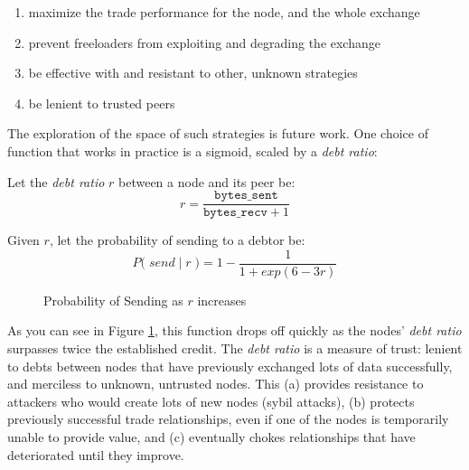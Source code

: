 \documentclass{sig-alternate}
\begin{document}
\begin{enumerate}
  \item maximize the trade performance for the node, and the whole exchange
  \item prevent freeloaders from exploiting and degrading the exchange
  \item be effective with and resistant to other, unknown
  strategies
  \item be lenient to trusted peers
\end{enumerate}

The exploration of the space of such strategies is future work.
One choice of function that works in practice is a sigmoid, scaled by a
\textit{debt ratio}:

Let the \textit{debt ratio} $ r $ between a node and its peer be:
  \[ r = \dfrac{\texttt{bytes\_sent}}{\texttt{bytes\_recv} + 1} \]

Given $r$, let the probability of sending to a debtor be:
  \[ P\Big( \; send \; | \; r \;\Big) = 1 - \dfrac{1}{1 + exp(6-3r)} \]

\begin{figure}
\centering
{}
\caption{Probability of Sending as $r$ increases}
\label{fig:psending-graph}
\end{figure}

As you can see in Figure \ref{fig:psending-graph}, this function drops off quickly as the nodes'
\textit{debt ratio} surpasses twice the established credit.
The \textit{debt ratio} is a measure of trust:
lenient to debts between nodes that have previously exchanged lots of data
successfully, and merciless to unknown, untrusted nodes. This
(a) provides resistance to attackers who would create lots of new nodes
(sybil attacks),
(b) protects previously successful trade relationships, even if one of the
nodes is temporarily unable to provide value, and
(c) eventually chokes relationships that have deteriorated until they
improve.
\end{document}
